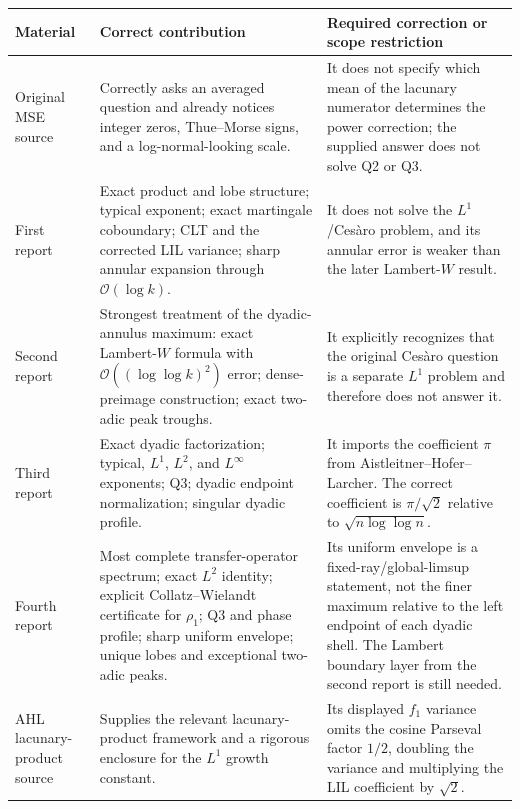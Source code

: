 \documentclass[11pt,oneside]{article}
\theoremstyle{definition}
\theoremstyle{remark}
\newcommand{\bigO}{\mathcal O}
\begin{document}
\begin{center}
\small
\begin{tabularx}{\textwidth}{@{}>{\raggedright\arraybackslash}p{}
 >{\raggedright\arraybackslash}p{}>{\raggedright\arraybackslash}X@{}}
\toprule
Material & Correct contribution & Required correction or scope restriction\\
\midrule
Original MSE source~\cite{mse-source}
& Correctly asks an averaged question and already notices integer zeros,
Thue--Morse signs, and a log-normal-looking scale.
& It does not specify which mean of the lacunary numerator determines the
power correction; the supplied answer does not solve Q2 or Q3.\\[0.7em]

First report~\cite{wave1a}
& Exact product and lobe structure; typical exponent; exact martingale
coboundary; CLT and the corrected LIL variance; sharp annular expansion through
$\bigO(\log k)$.
& It does not solve the $L^1$/Ces\`aro problem, and its annular error is weaker
than the later Lambert-$W$ result.\\[0.7em]

Second report~\cite{wave1b}
& Strongest treatment of the dyadic-annulus maximum: exact Lambert-$W$
formula with $\bigO((\log\log k)^2)$ error; dense-preimage construction; exact
two-adic peak troughs.
& It explicitly recognizes that the original Ces\`aro question is a separate
$L^1$ problem and therefore does not answer it.\\[0.7em]

Third report~\cite{wave1c}
& Exact dyadic factorization; typical, $L^1$, $L^2$, and $L^\infty$ exponents;
Q3; dyadic endpoint normalization; singular dyadic profile.
& It imports the coefficient $\pi$ from Aistleitner--Hofer--Larcher.  The
correct coefficient is $\pi/\sqrt2$ relative to
$\sqrt{n\log\log n}$.\\[0.7em]

Fourth report~\cite{wave1d}
& Most complete transfer-operator spectrum; exact $L^2$ identity; explicit
Collatz--Wielandt certificate for $\rho_1$; Q3 and phase profile; sharp uniform
envelope; unique lobes and exceptional two-adic peaks.
& Its uniform envelope is a fixed-ray/global-limsup statement, not the finer
maximum relative to the left endpoint of each dyadic shell.  The Lambert
boundary layer from the second report is still needed.\\[0.7em]

AHL lacunary-product source~\cite{ahl2017}
& Supplies the relevant lacunary-product framework and a rigorous enclosure
for the $L^1$ growth constant.
& Its displayed $f_1$ variance omits the cosine Parseval factor $1/2$, doubling
the variance and multiplying the LIL coefficient by $\sqrt2$.\\[0.7em]


\end{tabularx}
\end{center}
\end{document}
